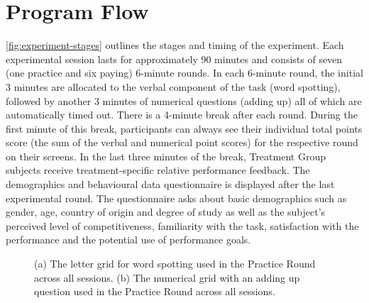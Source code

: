 \documentclass[a4paper,11pt,oneside]{article}
\begin{document}
\section{Program Flow}
\autoref{fig:experiment-stages} outlines the stages and timing of the experiment. Each experimental session lasts for approximately 90 minutes and consists of seven (one practice and six paying) 6-minute rounds. In
each 6-minute round, the initial 3 minutes are allocated to the verbal component of the task (word spotting), followed by another 3 minutes of numerical questions (adding up) all of which are automatically timed out. There is a 4-minute break after each round. During the first minute of this break, participants can always see their
individual total points score (the sum of the verbal and numerical point scores) for the respective round on their screens. In the last three minutes of the break, Treatment Group subjects receive treatment-specific relative performance feedback. The demographics and behavioural data questionnaire is displayed after the last experimental round. The questionnaire asks about basic demographics such as gender, age, country of origin and degree of study as well as the subject's perceived level of competitiveness, familiarity with the task, satisfaction with the performance and the potential use of performance goals.


\begin{figure}[!tb]
  \begin{center}
  \end{center}   
    \caption{(a) The letter grid for word spotting used in the Practice Round across all sessions. (b) The numerical grid with an adding up question used in the Practice Round across all sessions.}
  \end{figure}
  
\end{document}
